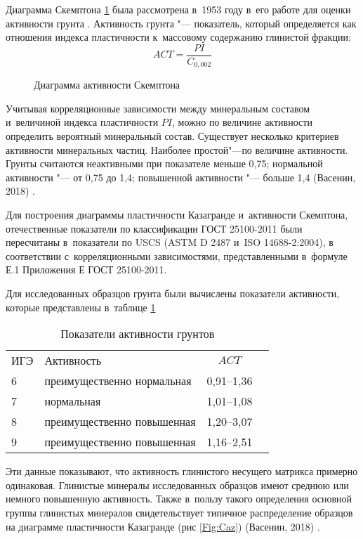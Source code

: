 Диаграмма Скемптона \ref{Fig:Skt} была рассмотрена в~1953 году в~его работе для оценки активности грунта \cite{skempton1953}.
Активность грунта "--- показатель, который определяется как отношения индекса пластичности к~массовому содержанию глинистой фракции:
$$ ACT = \frac{PI}{C_{0,002}}$$

\begin{figure}[ht]
    \centering
    \small
    
    \caption{Диаграмма активности Скемптона}
    \label{Fig:Skt}
  \end{figure}

Учитывая корреляционные зависимости между минеральным составом и~величиной индекса пластичности $PI$, можно по величине активности определить вероятный минеральный состав. Существует несколько критериев активности минеральных частиц. Наиболее простой"---по величине активности. 
Грунты считаются неактивными при показателе меньше 0,75; нормальной активности "--- от 0,75 до 1,4; повышенной активности "--- больше 1,4 (Васенин, 2018) \cite{vasenin2018}.


Для построения диаграммы пластичности Казагранде и~активности Скемптона, отечественные показатели по классификации ГОСТ 25100-2011 были пересчитаны в~показатели по USCS (ASTM D 2487 и~ISO 14688-2:2004), 
в соответствии с~корреляционными зависимостями, представленными в~формуле Е.1 Приложения Е ГОСТ 25100-2011.


Для исследованных образцов грунта были вычислены показатели активности, которые представлены в~таблице \ref{tab:ak}

\begin{table}[ht]
    \centering
    \small
    \caption{Показатели активности грунтов} \label{tab:ak}
    \renewcommand*{\arraystretch}{1.2}
    \begin{tabular}{p{}lcc}
    ИГЭ & Активность &  $ACT$ \\
    6 \dotfill &  преимущественно нормальная & 0,91--1,36 \\
    7 \dotfill &  нормальная & 1,01--1,08 \\
    8 \dotfill &  преимущественно повышенная & 1,20--3,07 \\
    9 \dotfill &  преимущественно повышенная & 1,16--2,51\\
    \end{tabular}
\end{table}
    

Эти данные показывают, что активность глинистого несущего матрикса примерно одинаковая. Глинистые минералы исследованных образцов имеют среднюю или немного повышенную активность.
Также в~пользу такого определения основной группы глинистых минералов свидетельствует типичное распределение образцов на диаграмме пластичности Казагранде (рис \ref{Fig:Caz}) (Васенин, 2018) \cite{vasenin2018}.








